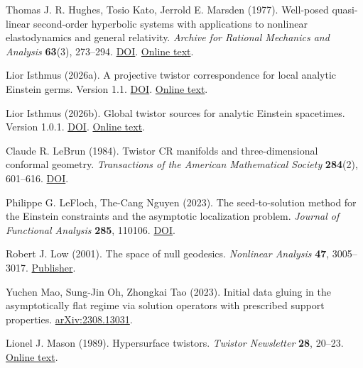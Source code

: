 \documentclass[
  english,
  11pt,
  reqno]{amsart}
\begin{document}
\leavevmode{}\label{ref-HughesKatoMarsden1977}Thomas J. R. Hughes, Tosio Kato, Jerrold E. Marsden (1977). Well-posed
quasi-linear second-order hyperbolic systems with applications to
nonlinear elastodynamics and general relativity. \emph{Archive for
Rational Mechanics and Analysis} \textbf{63}(3), 273--294.
\href{https://doi.org/10.1007/BF00251584}{DOI}.
\href{https://www.cds.caltech.edu/~marsden/bib/1977/02-HuKaMa1977/HuKaMa1977.pdf}{Online
text}.

\leavevmode{}\label{ref-IsthmusLocal2026}Lior Isthmus (2026a). A projective twistor correspondence for local
analytic Einstein germs. Version 1.1.
\href{https://doi.org/10.5281/zenodo.24197319}{DOI}.
\href{https://hexagonmath.org/2611.00123v2}{Online text}.

\leavevmode{}\label{ref-IsthmusGlobal2026}Lior Isthmus (2026b). Global twistor sources for analytic Einstein
spacetimes. Version 1.0.1.
\href{https://doi.org/10.5281/zenodo.24239028}{DOI}.
\href{https://hexagonmath.org/2611.00425v2}{Online text}.

\leavevmode{}\label{ref-LeBrun1984}Claude R. LeBrun (1984). Twistor CR manifolds and three-dimensional
conformal geometry. \emph{Transactions of the American Mathematical
Society} \textbf{284}(2), 601--616.
\href{https://doi.org/10.1090/S0002-9947-1984-0743735-9}{DOI}.

\leavevmode{}\label{ref-LeFlochNguyen2023}Philippe G. LeFloch, The-Cang Nguyen (2023). The seed-to-solution method
for the Einstein constraints and the asymptotic localization problem.
\emph{Journal of Functional Analysis} \textbf{285}, 110106.
\href{https://doi.org/10.1016/j.jfa.2023.110106}{DOI}.

\leavevmode{}\label{ref-Low2001}Robert J. Low (2001). The space of null geodesics. \emph{Nonlinear
Analysis} \textbf{47}, 3005--3017.
\href{https://www.sciencedirect.com/science/article/abs/pii/S0362546X01004217}{Publisher}.

\leavevmode{}\label{ref-MaoOhTao2023}Yuchen Mao, Sung-Jin Oh, Zhongkai Tao (2023). Initial data gluing in the
asymptotically flat regime via solution operators with prescribed
support properties.
\href{https://arxiv.org/abs/2308.13031}{arXiv:2308.13031}.

\leavevmode{}\label{ref-Mason1989}Lionel J. Mason (1989). Hypersurface twistors. \emph{Twistor Newsletter}
\textbf{28}, 20--23.
\href{https://people.maths.ox.ac.uk/lmason/Tn/28/TN28-06.pdf}{Online
text}.
\end{document}
